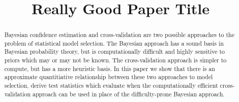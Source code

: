 \documentclass[12pt]{article}
\title{Really Good Paper Title}
\author{}
\newcommand{\paper}{paper}
\begin{document}
\maketitle

\begin{abstract}
  Bayesian confidence estimation and cross-validation are two possible
  approaches to the problem of statistical model selection.  The Bayesian
  approach has a sound basis in Bayesian probability theory, but is
  computationally difficult and highly sensitive to priors which may or may
  not be known.  The cross-validation approach is simpler to compute, but
  has a more heuristic basis.  In this \paper{} we show that there is an
  approximate quantitiative relationship between these two approaches to
  model selection, derive test statistics which evaluate when the
  computationally efficient cross-validation approach can be used in place
  of the difficulty-prone Bayesian approach.
\end{abstract}

\end{document}
